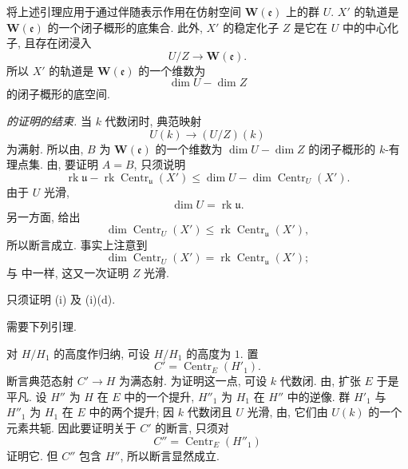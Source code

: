 将上述引理应用于通过伴随表示作用在仿射空间 \(\mathbf W(\mathfrak e)\) 上的群 \(U\).
\(X'\) 的轨道是 \(\mathbf W(\mathfrak e)\) 的一个闭子概形的底集合.
此外, \(X'\) 的稳定化子 \(Z\) 是它在 \(U\) 中的中心化子, 且存在闭浸入
\[
  U/Z\longrightarrow\mathbf W(\mathfrak e).
\]
所以 \(X'\) 的轨道是 \(\mathbf W(\mathfrak e)\) 的一个维数为
\[
  \dim U-\dim Z
\]
的闭子概形的底空间.

\smallskip
\noindent
{} \emph{ 的证明的结束.}
当 \(k\) 代数闭时, 典范映射
\[
  U(k)\longrightarrow(U/Z)(k)
\]
为满射. 所以由,
\(B\) 为 \(\mathbf W(\mathfrak e)\) 的一个维数为 \(\dim U-\dim Z\)
的闭子概形的 \(k\)-有理点集.
由, 要证明 \(A=B\), 只须说明
\[
  \operatorname{rk}\mathfrak u
  -\operatorname{rk}\operatorname{Centr}_{\mathfrak u}(X')
  \leq
  \dim U-\dim\operatorname{Centr}_U(X').
\]
由于 \(U\) 光滑,
\[
  \dim U=\operatorname{rk}\mathfrak u.
\]
另一方面,  给出
\[
  \dim\operatorname{Centr}_U(X')
  \leq
  \operatorname{rk}\operatorname{Centr}_{\mathfrak u}(X'),
\]
所以断言成立. 事实上注意到
\[
  \dim\operatorname{Centr}_U(X')
  =
  \operatorname{rk}\operatorname{Centr}_{\mathfrak u}(X');
\]
与 中一样, 这又一次证明 \(Z\) 光滑.


只须证明 (i) 及 (i)(d).

需要下列引理.


对 \(H/H_1\) 的高度作归纳, 可设 \(H/H_1\) 的高度为 \(1\). 置
\[
  C'=\operatorname{Centr}_E(H'_1).
\]
断言典范态射 \(C'\longrightarrow H\) 为满态射.
为证明这一点, 可设 \(k\) 代数闭.
由,
扩张 \(E\) 于是平凡.
设 \(H''\) 为 \(H\) 在 \(E\) 中的一个提升,
\(H''_1\) 为 \(H_1\) 在 \(H''\) 中的逆像.
群 \(H'_1\) 与 \(H''_1\) 为 \(H_1\) 在 \(E\) 中的两个提升;
因 \(k\) 代数闭且 \(U\) 光滑,
由,
它们由 \(U(k)\) 的一个元素共轭.
因此要证明关于 \(C'\) 的断言, 只须对
\[
  C''=\operatorname{Centr}_E(H''_1)
\]
证明它. 但 \(C''\) 包含 \(H''\), 所以断言显然成立.

